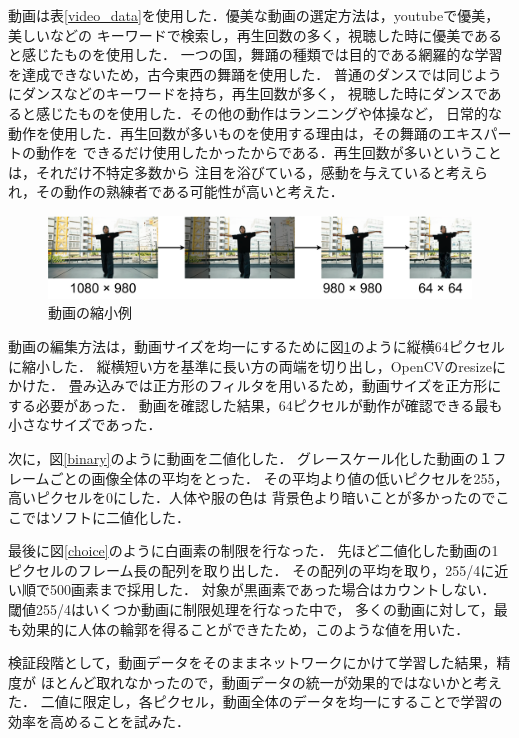 動画は表\ref{video_data}を使用した．優美な動画の選定方法は，youtubeで優美，美しいなどの
キーワードで検索し，再生回数の多く，視聴した時に優美であると感じたものを使用した．
一つの国，舞踊の種類では目的である網羅的な学習を達成できないため，古今東西の舞踊を使用した．
普通のダンスでは同じようにダンスなどのキーワードを持ち，再生回数が多く，
視聴した時にダンスであると感じたものを使用した．その他の動作はランニングや体操など，
日常的な動作を使用した．再生回数が多いものを使用する理由は，その舞踊のエキスパートの動作を
できるだけ使用したかったからである．再生回数が多いということは，それだけ不特定多数から
注目を浴びている，感動を与えていると考えられ，その動作の熟練者である可能性が高いと考えた．

\begin{figure}[t]
  \begin{center}
    \includegraphics[width=120mm]{images/chart/resize.pdf}
  \end{center}
  \caption{動画の縮小例}
  \label{resize}
\end{figure}

動画の編集方法は，動画サイズを均一にするために図\ref{resize}のように縦横64ピクセルに縮小した．
縦横短い方を基準に長い方の両端を切り出し，OpenCVのresize\cite{resize}にかけた．
畳み込みでは正方形のフィルタを用いるため，動画サイズを正方形にする必要があった．
動画を確認した結果，64ピクセルが動作が確認できる最も小さなサイズであった．

次に，図\ref{binary}のように動画を二値化した．
グレースケール化した動画の１フレームごとの画像全体の平均をとった．
その平均より値の低いピクセルを255，高いピクセルを0にした．人体や服の色は
背景色より暗いことが多かったのでここではソフトに二値化した．

最後に図\ref{choice}のように白画素の制限を行なった．
先ほど二値化した動画の1ピクセルのフレーム長の配列を取り出した．
その配列の平均を取り，255/4に近い順で500画素まで採用した．
対象が黒画素であった場合はカウントしない．
閾値255/4はいくつか動画に制限処理を行なった中で，
多くの動画に対して，最も効果的に人体の輪郭を得ることができたため，このような値を用いた．

検証段階として，動画データをそのままネットワークにかけて学習した結果，精度が
ほとんど取れなかったので，動画データの統一が効果的ではないかと考えた．
二値に限定し，各ピクセル，動画全体のデータを均一にすることで学習の効率を高めることを試みた．

